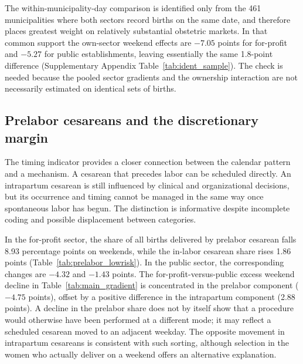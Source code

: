 \documentclass[12pt]{article}
\newcommand{\satab}[1]{Supplementary Appendix Table~\ref{#1}}
\begin{document}
The within-municipality-day comparison is identified only from the 461 municipalities where both sectors record births on the same date, and therefore places greatest weight on relatively substantial obstetric markets. In that common support the own-sector weekend effects are $-7.05$ points for for-profit and $-5.27$ for public establishments, leaving essentially the same 1.8-point difference (\satab{tab:ident_sample}). The check is needed because the pooled sector gradients and the ownership interaction are not necessarily estimated on identical sets of births.



\subsection{Prelabor cesareans and the discretionary margin}\label{sec:prelabor}

The timing indicator provides a closer connection between the calendar pattern and a mechanism. A cesarean that precedes labor can be scheduled directly. An intrapartum cesarean is still influenced by clinical and organizational decisions, but its occurrence and timing cannot be managed in the same way once spontaneous labor has begun. The distinction is informative despite incomplete coding and possible displacement between categories.

In the for-profit sector, the share of all births delivered by prelabor cesarean falls 8.93 percentage points on weekends, while the in-labor cesarean share rises 1.86 points (Table~\ref{tab:prelabor_lowrisk}). In the public sector, the corresponding changes are $-4.32$ and $-1.43$ points. The for-profit-versus-public excess weekend decline in Table~\ref{tab:main_gradient} is concentrated in the prelabor component ($-4.75$ points), offset by a positive difference in the intrapartum component (2.88 points). A decline in the prelabor share does not by itself show that a procedure would otherwise have been performed at a different mode; it may reflect a scheduled cesarean moved to an adjacent weekday. The opposite movement in intrapartum cesareans is consistent with such sorting, although selection in the women who actually deliver on a weekend offers an alternative explanation.
\end{document}
